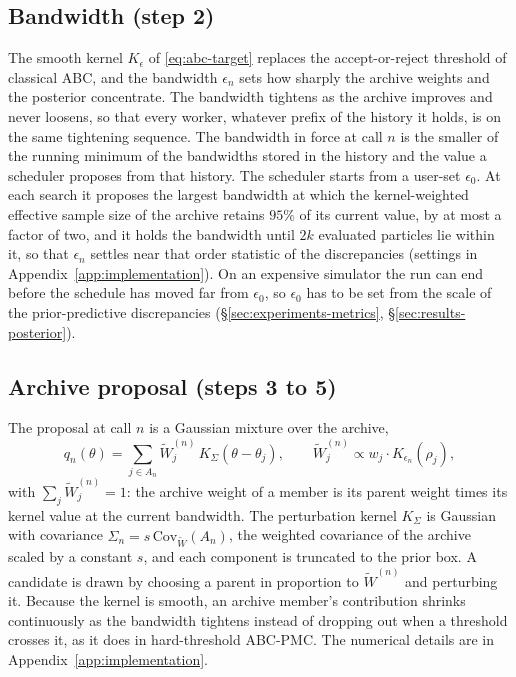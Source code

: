 \documentclass[10pt]{article}
\theoremstyle{plain}
\theoremstyle{definition}
\begin{document}
\subsection{Bandwidth (step 2)}\label{sec:method-tolerance}
The smooth kernel $K_\epsilon$ of \eqref{eq:abc-target} replaces the accept-or-reject threshold of classical ABC, and the bandwidth $\epsilon_n$ sets how sharply the archive weights and the posterior concentrate. The bandwidth tightens as the archive improves and never loosens, so that every worker, whatever prefix of the history it holds, is on the same tightening sequence. The bandwidth in force at call $n$ is the smaller of the running minimum of the bandwidths stored in the history and the value a scheduler proposes from that history. The scheduler starts from a user-set $\epsilon_0$. At each search it proposes the largest bandwidth at which the kernel-weighted effective sample size of the archive retains $95\%$ of its current value, by at most a factor of two, and it holds the bandwidth until $2k$ evaluated particles lie within it, so that $\epsilon_n$ settles near that order statistic of the discrepancies (settings in Appendix~\ref{app:implementation}). On an expensive simulator the run can end before the schedule has moved far from $\epsilon_0$, so $\epsilon_0$ has to be set from the scale of the prior-predictive discrepancies (\S\ref{sec:experiments-metrics}, \S\ref{sec:results-posterior}).

\subsection{Archive proposal (steps 3 to 5)}\label{sec:method-proposal}
The proposal at call $n$ is a Gaussian mixture over the archive,
\begin{equation}
q_n(\theta) = \sum_{j\in A_n}\tilde W_j^{(n)}\, K_\Sigma(\theta-\theta_j),
\qquad
\tilde W_j^{(n)} \propto w_j \cdot K_{\epsilon_n}(\rho_j),
\label{eq:steady-state-proposal}
\end{equation}
with $\sum_j \tilde W_j^{(n)}=1$: the archive weight of a member is its parent weight times its kernel value at the current bandwidth. The perturbation kernel $K_\Sigma$ is Gaussian with covariance $\Sigma_n = s\,\widehat{\mathrm{Cov}}_{\tilde W}(A_n)$, the weighted covariance of the archive scaled by a constant $s$, and each component is truncated to the prior box. A candidate is drawn by choosing a parent in proportion to $\tilde W^{(n)}$ and perturbing it. Because the kernel is smooth, an archive member's contribution shrinks continuously as the bandwidth tightens instead of dropping out when a threshold crosses it, as it does in hard-threshold ABC-PMC. The numerical details are in Appendix~\ref{app:implementation}.
\end{document}
